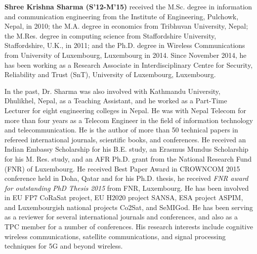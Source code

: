 \documentclass[journal, twocolumn]{IEEEtran}
\begin{document}
\begin{IEEEbiography}
{\textbf{Shree Krishna Sharma (S'12-M'15)}} received the M.Sc. degree in information and communication engineering from the Institute of Engineering, Pulchowk, Nepal, in 2010; the M.A. degree in economics from Tribhuvan University, Nepal; the M.Res. degree in computing science from Staffordshire University, Staffordshire, U.K., in 2011; and the Ph.D. degree in Wireless Communications from University of Luxembourg, Luxembourg in 2014. Since November 2014, he has been working as a Research Associate in Interdisciplinary Centre for Security, Reliability and Trust (SnT), University of Luxembourg, Luxembourg.

In the past, Dr. Sharma was also involved with Kathmandu University, Dhulikhel, Nepal, as a Teaching Assistant, and he worked as a Part-Time Lecturer for eight engineering colleges in Nepal. He was with Nepal Telecom for more than four years as a Telecom Engineer in the field of information technology and telecommunication. He is the author of more than 50 technical papers in refereed international journals, scientific books, and conferences. He received an Indian Embassy Scholarship for his B.E. study, an Erasmus Mundus Scholarship for his M. Res. study, and an AFR Ph.D. grant from the National Research Fund (FNR) of Luxembourg. He received Best Paper Award in CROWNCOM 2015 conference held in Doha, Qatar and for his Ph.D. thesis, he received \textit{FNR award for outstanding PhD Thesis 2015} from FNR, Luxembourg. He has been involved in EU FP7 CoRaSat project, EU H2020 project SANSA, ESA project ASPIM, and Luxembourgish national projects Co2Sat, and SeMIGod. He has been serving as a reviewer for several international journals and conferences, and also as a TPC member for a number of conferences. His research interests include cognitive wireless communications, satellite communications, and signal processing techniques for 5G and beyond wireless.
\end{IEEEbiography}
\end{document}
